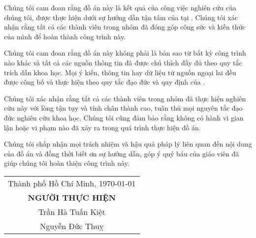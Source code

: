 
\begin{declaration}

Chúng tôi cam đoan rằng đồ án này là kết quả của công việc nghiên cứu của chúng tôi, được thực hiện dưới sự hướng dẫn tận tâm của \Proc tại \Uni. Chúng tôi xác nhận rằng tất cả các thành viên trong nhóm đã đóng góp công sức và kiến thức của mình để hoàn thành công trình này.

Chúng tôi cam đoan rằng đồ án này không phải là bản sao từ bất kỳ công trình nào khác và tất cả các nguồn thông tin đã được chú thích đầy đủ theo quy tắc trích dẫn khoa học. Mọi ý kiến, thông tin hay dữ liệu từ nguồn ngoại lai đều được công bố và thực hiện theo quy tắc đạo đức và quy định của \Uni.

Chúng tôi xác nhận rằng tất cả các thành viên trong nhóm đã thực hiện nghiên cứu này với lòng tận tụy và tính chân thành cao, tuân thủ mọi nguyên tắc đạo đức nghiên cứu khoa học. Chúng tôi cũng đảm bảo rằng không có hành vi gian lận hoặc vi phạm nào đã xảy ra trong quá trình thực hiện đồ án.

Chúng tôi chấp nhận mọi trách nhiệm và hậu quả pháp lý liên quan đến nội dung của đồ án và đồng thời biết ơn sự hướng dẫn, góp ý quý báu của giáo viên \Proc đã giúp chúng tôi hoàn thiện công trình này.

\begin{flushright}

    \begin{tabular}{@{}c@{}}
    Thành phố Hồ Chí Minh, \today \\
    \textbf{NGƯỜI THỰC HIỆN} \\
    Trần Hà Tuấn Kiệt \\
    Nguyễn Đức Thuỵ
    \end{tabular}

\end{flushright}
\end{declaration}

\newpage

